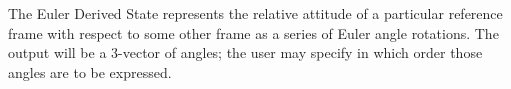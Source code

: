 %
%
% 
%


The Euler Derived State represents the relative attitude of a particular reference frame with respect to some other frame as a series of Euler angle rotations.  The output will be a 3-vector of angles; the user may specify in which order those angles are to be expressed.













